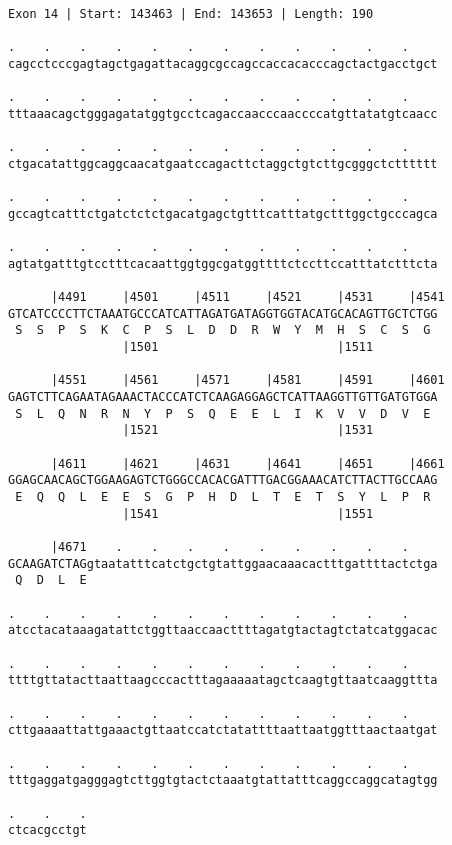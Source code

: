 \documentclass{article}
\begin{document}
\begin{Verbatim}
Exon 14 | Start: 143463 | End: 143653 | Length: 190
 
.    .    .    .    .    .    .    .    .    .    .    .    
cagcctcccgagtagctgagattacaggcgccagccaccacacccagctactgacctgct
  
.    .    .    .    .    .    .    .    .    .    .    .    
tttaaacagctgggagatatggtgcctcagaccaacccaaccccatgttatatgtcaacc
  
.    .    .    .    .    .    .    .    .    .    .    .    
ctgacatattggcaggcaacatgaatccagacttctaggctgtcttgcgggctctttttt
  
.    .    .    .    .    .    .    .    .    .    .    .    
gccagtcatttctgatctctctgacatgagctgtttcatttatgctttggctgcccagca
  
.    .    .    .    .    .    .    .    .    .    .    .    
agtatgatttgtcctttcacaattggtggcgatggttttctccttccatttatctttcta
  
      |4491     |4501     |4511     |4521     |4531     |4541
GTCATCCCCTTCTAAATGCCCATCATTAGATGATAGGTGGTACATGCACAGTTGCTCTGG
 S  S  P  S  K  C  P  S  L  D  D  R  W  Y  M  H  S  C  S  G 
                |1501                         |1511         
  
      |4551     |4561     |4571     |4581     |4591     |4601
GAGTCTTCAGAATAGAAACTACCCATCTCAAGAGGAGCTCATTAAGGTTGTTGATGTGGA
 S  L  Q  N  R  N  Y  P  S  Q  E  E  L  I  K  V  V  D  V  E 
                |1521                         |1531         
  
      |4611     |4621     |4631     |4641     |4651     |4661
GGAGCAACAGCTGGAAGAGTCTGGGCCACACGATTTGACGGAAACATCTTACTTGCCAAG
 E  Q  Q  L  E  E  S  G  P  H  D  L  T  E  T  S  Y  L  P  R 
                |1541                         |1551         
  
      |4671    .    .    .    .    .    .    .    .    .    
GCAAGATCTAGgtaatatttcatctgctgtattggaacaaacactttgattttactctga
 Q  D  L  E                                                 
  
.    .    .    .    .    .    .    .    .    .    .    .    
atcctacataaagatattctggttaaccaacttttagatgtactagtctatcatggacac
  
.    .    .    .    .    .    .    .    .    .    .    .    
ttttgttatacttaattaagcccactttagaaaaatagctcaagtgttaatcaaggttta
  
.    .    .    .    .    .    .    .    .    .    .    .    
cttgaaaattattgaaactgttaatccatctatattttaattaatggtttaactaatgat
  
.    .    .    .    .    .    .    .    .    .    .    .    
tttgaggatgagggagtcttggtgtactctaaatgtattatttcaggccaggcatagtgg
  
.    .    .
ctcacgcctgt
\end{Verbatim}
\end{document}
